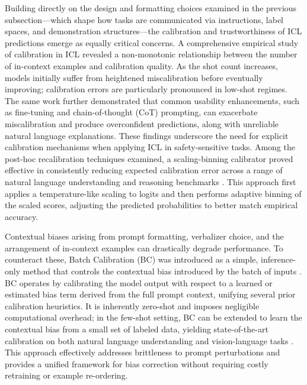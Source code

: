 \documentclass[11pt]{article}
\begin{document}
Building directly on the design and formatting choices examined in the previous subsection---which shape how tasks are communicated via instructions, label spaces, and demonstration structures---the calibration and trustworthiness of ICL predictions emerge as equally critical concerns. A comprehensive empirical study of calibration in ICL \cite{ref88} revealed a non-monotonic relationship between the number of in-context examples and calibration quality. As the shot count increases, models initially suffer from heightened miscalibration before eventually improving; calibration errors are particularly pronounced in low-shot regimes. The same work further demonstrated that common usability enhancements, such as fine-tuning and chain-of-thought (CoT) prompting, can exacerbate miscalibration and produce overconfident predictions, along with unreliable natural language explanations. These findings underscore the need for explicit calibration mechanisms when applying ICL in safety-sensitive tasks. Among the post-hoc recalibration techniques examined, a scaling-binning calibrator proved effective in consistently reducing expected calibration error across a range of natural language understanding and reasoning benchmarks \cite{ref88}. This approach first applies a temperature-like scaling to logits and then performs adaptive binning of the scaled scores, adjusting the predicted probabilities to better match empirical accuracy.

Contextual biases arising from prompt formatting, verbalizer choice, and the arrangement of in-context examples can drastically degrade performance. To counteract these, Batch Calibration (BC) was introduced as a simple, inference-only method that controls the contextual bias introduced by the batch of inputs \cite{ref89}. BC operates by calibrating the model output with respect to a learned or estimated bias term derived from the full prompt context, unifying several prior calibration heuristics. It is inherently zero-shot and imposes negligible computational overhead; in the few-shot setting, BC can be extended to learn the contextual bias from a small set of labeled data, yielding state-of-the-art calibration on both natural language understanding and vision-language tasks \cite{ref89}. This approach effectively addresses brittleness to prompt perturbations and provides a unified framework for bias correction without requiring costly retraining or example re-ordering.
\end{document}
